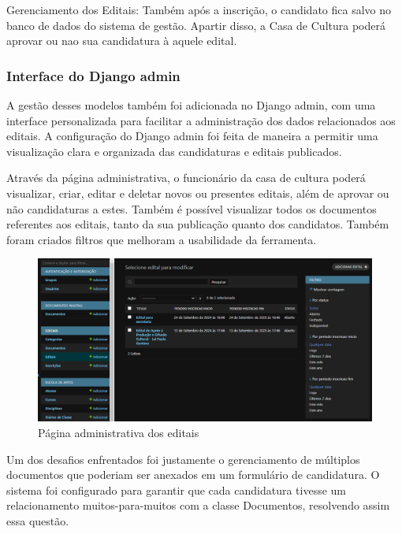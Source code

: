 Gerenciamento dos Editais: Também após a inscrição, o candidato fica salvo no banco de dados do sistema de gestão. Apartir disso, a Casa de Cultura poderá aprovar ou nao sua candidatura à aquele edital.

\subsubsection{Interface do Django admin}

A gestão desses modelos também foi adicionada no Django admin, com uma interface personalizada para facilitar a administração dos dados relacionados aos editais. A configuração do Django admin foi feita de maneira a permitir uma visualização clara e organizada das candidaturas e editais publicados.

Através da página administrativa, o funcionário da casa de cultura poderá visualizar, criar, editar e deletar novos ou presentes editais, além de aprovar ou não candidaturas a estes. Também é possível visualizar todos os documentos referentes aos editais, tanto da sua publicação quanto dos candidatos. Também foram criados filtros que melhoram a usabilidade da ferramenta.

\begin{figure}[htb]
	\caption{\label{fig_grafico}Página administrativa dos editais}
	\begin{center}
	    \includegraphics[scale=0.45]{./img/admin_edital.png}
	\end{center}
\end{figure}


Um dos desafios enfrentados foi justamente o gerenciamento de múltiplos documentos que poderiam ser anexados em um formulário de candidatura. O sistema foi configurado para garantir que cada candidatura tivesse um relacionamento muitos-para-muitos com a classe Documentos, resolvendo assim essa questão.



